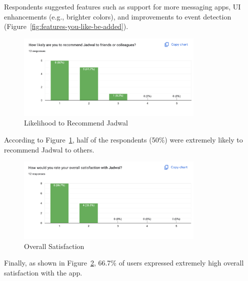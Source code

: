 Respondents suggested features such as support for more messaging apps, UI enhancements (e.g., brighter colors), and improvements to event detection (Figure~\ref{fig:features-you-like-be-added}).

\begin{figure}[H]
\centering
\includegraphics[width=0.8\textwidth]{images/end-survey/13-likely-to-recommend.png}
\caption{Likelihood to Recommend Jadwal}
\label{fig:likely-to-recommend}
\end{figure}

According to Figure~\ref{fig:likely-to-recommend}, half of the respondents (50\%) were extremely likely to recommend Jadwal to others.

\begin{figure}[H]
\centering
\includegraphics[width=0.8\textwidth]{images/end-survey/14-overall-satsifacation.png}
\caption{Overall Satisfaction}
\label{fig:overall-satsifacation}
\end{figure}

Finally, as shown in Figure~\ref{fig:overall-satsifacation}, 66.7\% of users expressed extremely high overall satisfaction with the app.